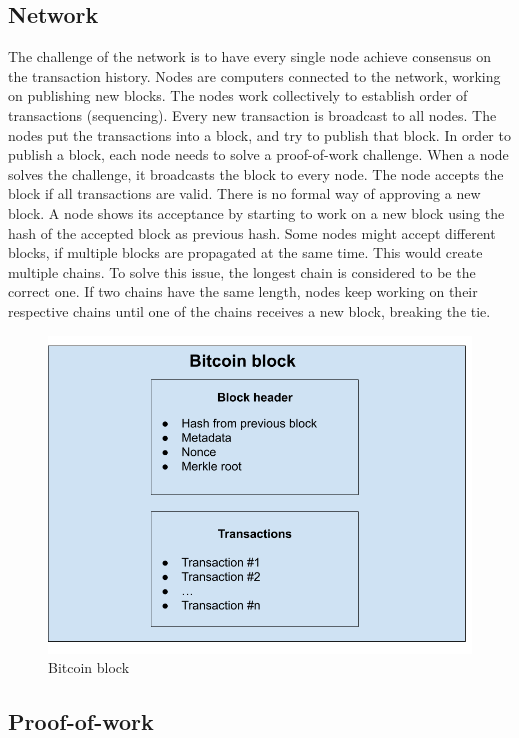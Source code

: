 \subsection{Network}
The challenge of the network is to have every single node achieve consensus on the transaction history. Nodes are computers connected to the network,
working on publishing new blocks. The nodes work collectively to establish order of transactions (sequencing). Every new transaction is broadcast to all nodes.
The nodes put the transactions into a block, and try to publish that block. In order to publish a block, each node needs to solve a proof-of-work challenge.
When a node solves the challenge, it broadcasts the block to every node. The node accepts the block if all transactions are valid. There is no formal
way of approving a new block. A node shows its acceptance by starting to work on a new block using the hash of the accepted block as previous hash.
Some nodes might accept different blocks, if multiple blocks are propagated at the same time. This would create multiple chains. To solve this issue, the longest chain is considered to be the correct one.
If two chains have the same length, nodes keep working on their respective chains until one of the chains receives a new block, breaking the tie. \cite{MB17}

\begin{figure}[H]
   \centering
   \includegraphics[width=130mm]{BitcoinBlock.png}
   \caption{Bitcoin block}
   \label{overflow}
   \end{figure}


\subsection{Proof-of-work}

